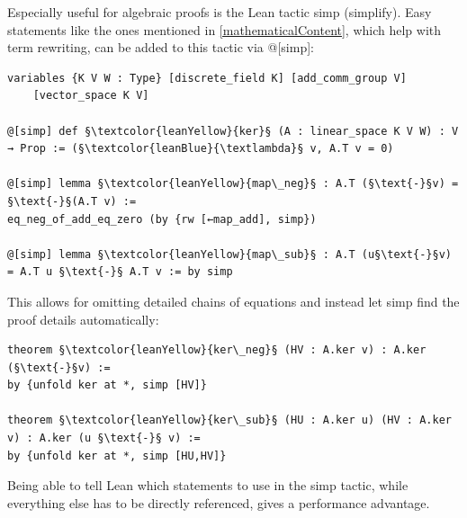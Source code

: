 \documentclass[11pt]{article}
\begin{document}
Especially useful for algebraic proofs is the Lean tactic {\lean simp} (simplify). Easy statements like the ones mentioned in \ref{mathematicalContent}, which help with term rewriting, can be added to this tactic via {\lean @[simp]}:
\begin{lstlisting}
variables {K V W : Type} [discrete_field K] [add_comm_group V]
	[vector_space K V]

@[simp] def §\textcolor{leanYellow}{ker}§ (A : linear_space K V W) : V → Prop := (§\textcolor{leanBlue}{\textlambda}§ v, A.T v = 0)

@[simp] lemma §\textcolor{leanYellow}{map\_neg}§ : A.T (§\text{-}§v) = §\text{-}§(A.T v) :=
eq_neg_of_add_eq_zero (by {rw [←map_add], simp})

@[simp] lemma §\textcolor{leanYellow}{map\_sub}§ : A.T (u§\text{-}§v) = A.T u §\text{-}§ A.T v := by simp
\end{lstlisting}
This allows for omitting detailed chains of equations and instead let {\lean simp} find the proof details automatically:
\newpage
\begin{lstlisting}
theorem §\textcolor{leanYellow}{ker\_neg}§ (HV : A.ker v) : A.ker (§\text{-}§v) :=
by {unfold ker at *, simp [HV]}

theorem §\textcolor{leanYellow}{ker\_sub}§ (HU : A.ker u) (HV : A.ker v) : A.ker (u §\text{-}§ v) :=
by {unfold ker at *, simp [HU,HV]}
\end{lstlisting}
Being able to tell Lean which statements to use in the {\lean simp} tactic, while everything else has to be directly referenced, gives a performance advantage.
\end{document}
